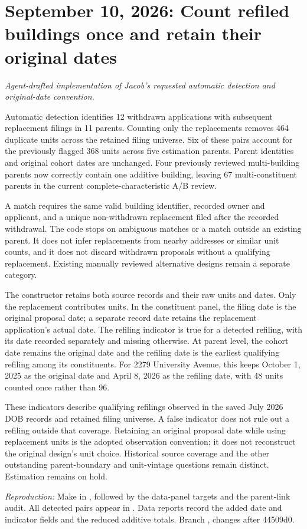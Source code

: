 \clearpage
\section*{September 10, 2026: Count refiled buildings once and retain their original dates}
\textit{Agent-drafted implementation of Jacob's requested automatic detection and original-date convention.}

Automatic detection identifies 12 withdrawn applications with subsequent replacement filings in 11 parents. Counting only the replacements removes 464 duplicate units across the retained filing universe. Six of these pairs account for the previously flagged 368 units across five estimation parents. Parent identities and original cohort dates are unchanged. Four previously reviewed multi-building parents now correctly contain one additive building, leaving 67 multi-constituent parents in the current complete-characteristic A/B review.

A match requires the same valid building identifier, recorded owner and applicant, and a unique non-withdrawn replacement filed after the recorded withdrawal. The code stops on ambiguous matches or a match outside an existing parent. It does not infer replacements from nearby addresses or similar unit counts, and it does not discard withdrawn proposals without a qualifying replacement. Existing manually reviewed alternative designs remain a separate category.

The constructor retains both source records and their raw units and dates. Only the replacement contributes units. In the constituent panel, the filing date is the original proposal date; a separate record date retains the replacement application's actual date. The refiling indicator is true for a detected refiling, with its date recorded separately and missing otherwise. At parent level, the cohort date remains the original date and the refiling date is the earliest qualifying refiling among its constituents. For 2279 University Avenue, this keeps October 1, 2025 as the original date and April 8, 2026 as the refiling date, with 48 units counted once rather than 96.

These indicators describe qualifying refilings observed in the saved July 2026 DOB records and retained filing universe. A false indicator does not rule out a refiling outside that coverage. Retaining an original proposal date while using replacement units is the adopted observation convention; it does not reconstruct the original design's unit choice. Historical source coverage and the other outstanding parent-boundary and unit-vintage questions remain distinct. Estimation remains on hold.

\textit{Reproduction:} Make in , followed by the data-panel targets and the parent-link audit. All detected pairs appear in . Data reports record the added date and indicator fields and the reduced additive totals. Branch , changes after 44509d0.
